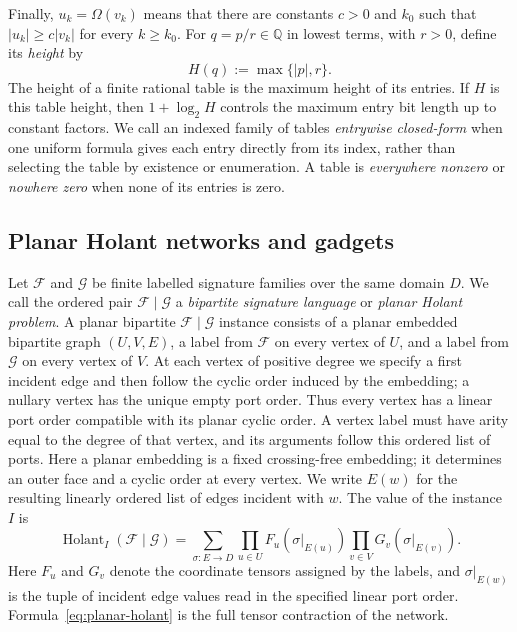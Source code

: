 \documentclass[11pt]{article}
\theoremstyle{definition}
\theoremstyle{remark}
\newcommand{\Q}{\mathbb Q}
\newcommand{\cF}{\mathcal F}
\newcommand{\cG}{\mathcal G}
\newcommand{\Hol}{\operatorname{Holant}}
\begin{document}
Finally, $u_k=\Omega(v_k)$ means that there are constants $c>0$ and $k_0$
such that $|u_k|\ge c|v_k|$ for every $k\ge k_0$.  For
$q=p/r\in\Q$ in lowest terms, with $r>0$, define its \emph{height} by
\[
  H(q):=\max\{|p|,r\}.
\]
The height of a finite rational table is the maximum height of its entries.
If $H$ is this table height, then $1+\log_2 H$ controls the maximum entry
bit length up to constant factors.  We call an indexed family of tables
\emph{entrywise closed-form} when one uniform formula gives each entry
directly from its index, rather than selecting the table by existence or
enumeration.  A table is \emph{everywhere nonzero} or \emph{nowhere zero}
when none of its entries is zero.

\subsection{Planar Holant networks and gadgets}
\label{sec:holant-preliminaries}

Let $\cF$ and $\cG$ be finite labelled signature families over the same
domain $D$.  We call the ordered pair $\cF\mid\cG$ a \emph{bipartite
signature language} or \emph{planar Holant problem}.  A planar bipartite
$\cF\mid\cG$ instance consists of a planar
embedded bipartite graph $(U,V,E)$, a label from $\cF$ on every vertex of
$U$, and a label from $\cG$ on every vertex of $V$.  At each vertex of
positive degree we specify a first incident edge and then follow the cyclic
order induced by the embedding; a nullary vertex has the unique empty port
order.  Thus every vertex has a linear port order compatible with its
planar cyclic order.  A vertex label must have arity equal to the degree of
that vertex, and its arguments follow this ordered list of ports.  Here a
planar embedding is a fixed crossing-free embedding; it determines an outer
face and a cyclic order at every vertex.  We write $E(w)$ for the resulting
linearly ordered list of edges incident with $w$.
The value of the instance $I$ is
\begin{equation}
  \Hol_I(\cF\mid\cG)
  =
  \sum_{\sigma\colon E\to D}
    \prod_{u\in U} F_u(\sigma|_{E(u)})
    \prod_{v\in V} G_v(\sigma|_{E(v)}).
  \label{eq:planar-holant}
\end{equation}
Here $F_u$ and $G_v$ denote the coordinate tensors assigned by the labels,
and $\sigma|_{E(w)}$ is the tuple of incident edge values read in the
specified linear port order.  Formula~\eqref{eq:planar-holant} is the full
tensor contraction of the network.
\end{document}
